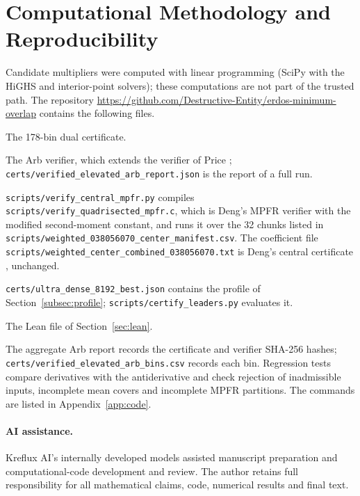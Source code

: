 \documentclass[11pt,a4paper]{article}
\theoremstyle{definition}
\theoremstyle{remark}
\begin{document}
\section{Computational Methodology and Reproducibility}
\label{sec:repro}

Candidate multipliers were computed with linear programming (SciPy with the HiGHS and interior-point solvers); these computations are not part of the trusted path. The repository \url{https://github.com/Destructive-Entity/erdos-minimum-overlap} contains the following files.
\begin{description}\raggedright
\item[{\nolinkurl{certs/erdos_elevated_candidate.json}}] The 178-bin dual certificate.
\item[{\nolinkurl{scripts/prove_erdos.py}}] The Arb verifier, which extends the verifier of Price \cite{price2026}; \nolinkurl{certs/verified_elevated_arb_report.json} is the report of a full run.
\item[Central-window check.] \nolinkurl{scripts/verify_central_mpfr.py} compiles \nolinkurl{scripts/verify_quadrisected_mpfr.c}, which is Deng's MPFR verifier with the modified second-moment constant, and runs it over the 32 chunks listed in \nolinkurl{scripts/weighted_038056070_center_manifest.csv}. The coefficient file \nolinkurl{scripts/weighted_center_combined_038056070.txt} is Deng's central certificate \cite{deng2026}, unchanged.
\item[Discrete profile.] \nolinkurl{certs/ultra_dense_8192_best.json} contains the profile of Section~\ref{subsec:profile}; \nolinkurl{scripts/certify_leaders.py} evaluates it.
\item[{\nolinkurl{formal/Erdos36.lean}}] The Lean file of Section~\ref{sec:lean}.
\end{description}
The aggregate Arb report records the certificate and verifier SHA-256 hashes; \nolinkurl{certs/verified_elevated_arb_bins.csv} records each bin. Regression tests compare derivatives with the antiderivative and check rejection of inadmissible inputs, incomplete mean covers and incomplete MPFR partitions. The commands are listed in Appendix~\ref{app:code}.

\paragraph{AI assistance.}
Kreflux AI's internally developed models assisted manuscript preparation and computational-code development and review. The author retains full responsibility for all mathematical claims, code, numerical results and final text.
\end{document}
